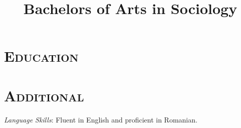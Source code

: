 \begin{resume}

\section{\textsc{Education}}
\title{Bachelors of Arts in Sociology}
\location{}
\begin{position}
\end{position}

\section{\textsc{Additional}}
\emph{Language Skills}: Fluent in English and proficient in Romanian.\\
\\
\\







\end{resume}


